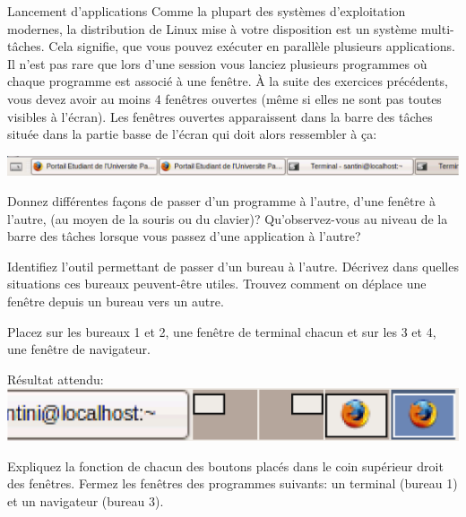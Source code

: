 \begin{exercice}
  \begin{exercicelet}{Lancement d'applications}
    Comme la plupart des systèmes d'exploitation modernes, la
    distribution de Linux mise à votre disposition est un système
    multi-tâches. Cela signifie, que vous pouvez exécuter en parallèle
    plusieurs applications. Il n'est pas rare que lors d'une session
    vous lanciez plusieurs programmes où chaque programme est associé à
    une fenêtre. À la suite des exercices précédents, vous devez avoir
    au moins 4 fenêtres ouvertes (même si elles ne sont pas toutes
    visibles à l'écran). Les fenêtres ouvertes apparaissent dans la
    barre des tâches située dans la partie basse de l'écran qui doit
    alors ressembler à ça:

    \centerline{\includegraphics[width=.8\linewidth]{img/s01/barredestaches.png}}

    \begin{questions}
    \item Donnez différentes façons de passer d'un programme à l'autre,
      d'une fenêtre à l'autre, (au moyen de la souris ou du clavier)?
      Qu'observez-vous au niveau de la barre des tâches lorsque vous
      passez d'une application à l'autre?
    \item Identifiez l'outil permettant de passer d'un bureau à l'autre.
      Décrivez dans quelles situations ces bureaux peuvent-être utiles.
      Trouvez comment on déplace une fenêtre depuis un bureau vers un
      autre.
    \item Placez sur les bureaux 1 et 2, une fenêtre de terminal chacun
      et sur les 3 et 4, une fenêtre de navigateur.
      \centerline{Résultat
        attendu: \includegraphics[height=2ex]{img/s01/barrepeuplee.png}}
    \item Expliquez la fonction de chacun des boutons placés dans le
      coin supérieur droit des fenêtres.  Fermez les fenêtres des
      programmes suivants: un terminal (bureau 1) et un navigateur
      (bureau 3).
    \end{questions}
  \end{exercicelet}
\end{exercice}

